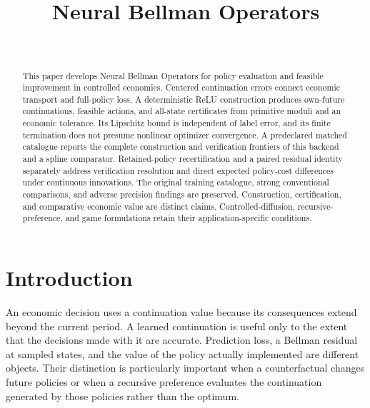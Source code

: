 \documentclass[ecta,nameyear,draft]{econsocart}
\begin{document}
\begin{frontmatter}
\title{Neural Bellman Operators}
\begin{aug}
\author[id=au1,addressref={add1}]{~}
\address[id=add1]{Peking University}
\end{aug}
\begin{abstract}
This paper develops Neural Bellman Operators for policy evaluation and feasible improvement in controlled economies. Centered continuation errors connect economic transport and full-policy loss. A deterministic ReLU construction produces own-future continuations, feasible actions, and all-state certificates from primitive moduli and an economic tolerance. Its Lipschitz bound is independent of label error, and its finite termination does not presume nonlinear optimizer convergence. A predeclared matched catalogue reports the complete construction and verification frontiers of this backend and a spline comparator. Retained-policy recertification and a paired residual identity separately address verification resolution and direct expected policy-cost differences under continuous innovations. The original training catalogue, strong conventional comparisons, and adverse precision findings are preserved. Construction, certification, and comparative economic value are distinct claims. Controlled-diffusion, recursive-preference, and game formulations retain their application-specific conditions.
\end{abstract}
\begin{keyword}
\end{keyword}
\end{frontmatter}

\section{Introduction}\label{sec:introduction}
An economic decision uses a continuation value because its consequences extend beyond the current period. A learned continuation is useful only to the extent that the decisions made with it are accurate. Prediction loss, a Bellman residual at sampled states, and the value of the policy actually implemented are different objects. Their distinction is particularly important when a counterfactual changes future policies or when a recursive preference evaluates the continuation generated by those policies rather than the optimum.
\end{document}
